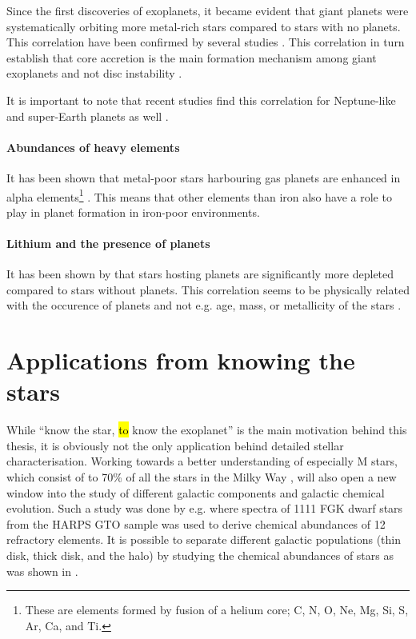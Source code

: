 Since the first discoveries of exoplanets, it became evident that giant planets were systematically
orbiting more metal-rich stars compared to stars with no planets. This correlation have been
confirmed by several studies \citep{Gonzalez1997,Santos2004,Fischer2005,Sousa2008a,Mortier2013b}.
This correlation in turn establish that core accretion is the main formation mechanism among giant
exoplanets \citep{Pollack1996,Ida2004,Mordasini2012} and not disc instability \citep{Boss2002}.

It is important to note that recent studies find this correlation for Neptune-like and
super-Earth planets as well \citep{Wang2015,Zhu2016}.

\paragraph{Abundances of heavy elements}

It has been shown that metal-poor stars harbouring gas planets are enhanced in alpha
elements\footnote{These are elements formed by fusion of a helium core; C, N, O, Ne, Mg, Si, S, Ar,
Ca, and Ti.} \citep[see e.g.][]{Adibekyan2012a}. This means that other elements than iron also have
a role to play in planet formation in iron-poor environments.


\paragraph{Lithium and the presence of planets}

It has been shown by \citet{Israelian2004,Delgado2014} that stars hosting planets are significantly
more  depleted compared to stars without planets. This correlation seems to be physically
related with the occurence of planets and not e.g. age, mass, or metallicity of the stars
\citep{Sousa2010}.



\section{Applications from knowing the stars}
\label{sec:stars_application}

While ``know the star, \hl{to} know the exoplanet'' is the main motivation behind this thesis, it is
obviously not the only application behind detailed stellar characterisation. Working towards a
better understanding of especially M stars, which consist of to 70\% of all the stars in the Milky
Way \citep{Bochanski2010}, will also open a new window into the study of different galactic
components and galactic chemical evolution. Such a study was done by e.g.
\citet{Adibekyan2012,Delgado2017} where spectra of 1111 FGK dwarf stars from the HARPS GTO sample
was used to derive chemical abundances of 12 refractory elements. It is possible to separate
different galactic populations (thin disk, thick disk, and the halo) by studying the chemical
abundances of stars as was shown in \citet{Adibekyan2012}.

